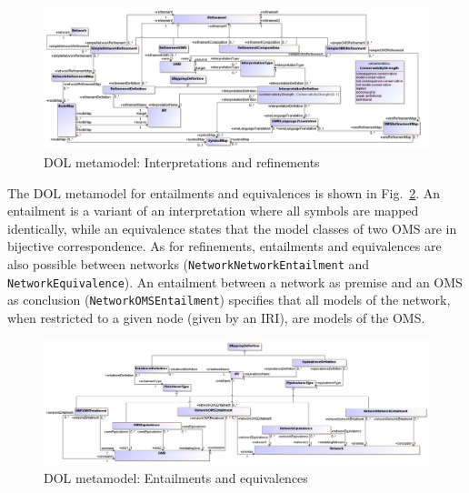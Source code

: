 \documentclass[10pt,fleqn,final]{scrreprt}
\newcommand*{\syntax}[1]{\texttt{#1}}
\newenvironment{definitions}[0]{\medskip }{}
\begin{document}
\begin{definitions}
\medskip
\begin{figure}
  \centering
    \includegraphics[scale=0.42]{mof/interpretations&refinements.png}
  \caption{DOL metamodel: Interpretations and refinements}
  \label{fig:interpretations&refinements}
\end{figure}

The DOL metamodel for entailments and equivalences is shown in 
Fig.~\ref{fig:entailment&equivalence}.
An entailment is a variant of an interpretation where all symbols are
mapped identically, while an equivalence states that the model classes
of two OMS are in bijective correspondence. As for refinements,
entailments and equivalences are also possible between networks
(\syntax{NetworkNetworkEntailment} and \syntax{NetworkEquivalence}).
An entailment between a network as premise and an OMS as conclusion
(\syntax{NetworkOMSEntailment}) specifies that all models of the
network, when restricted to a given node (given by an IRI), are
models of the OMS.

\begin{figure}
  \centering
    \includegraphics[scale=0.39]{mof/entailment&equivalence.png}
  \caption{DOL metamodel: Entailments and equivalences}
  \label{fig:entailment&equivalence}
\end{figure}






\end{definitions}
\end{document}
